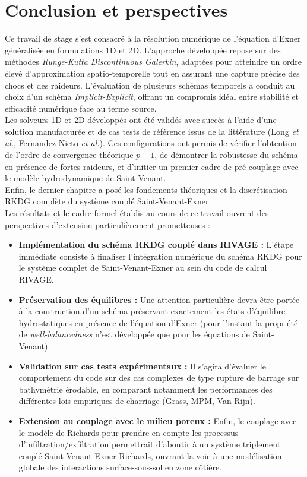 \documentclass[11pt, a4paper, oneside]{report}
\begin{document}
\chapter*{Conclusion et perspectives}

Ce travail de stage s'est consacré à la résolution numérique de l'équation d'Exner généralisée en formulations 1D et 2D. L'approche développée repose sur des méthodes \textit{Runge-Kutta Discontinuous Galerkin}, adaptées pour atteindre un ordre élevé d'approximation spatio-temporelle tout en assurant une capture précise des chocs et des raideurs. L'évaluation de plusieurs schémas temporels a conduit au choix d'un schéma \textit{Implicit-Explicit}, offrant un compromis idéal entre stabilité et efficacité numérique face au terme source. \\
Les solveurs 1D et 2D développés ont été validés avec succès à l'aide d'une solution manufacturée et de cas tests de référence issus de la littérature (Long \textit{et al.}, Fernandez-Nieto \textit{et al.}). Ces configurations ont permis de vérifier l'obtention de l'ordre de convergence théorique $p+1$, de démontrer la robustesse du schéma en présence de fortes raideurs, et d'initier un premier cadre de pré-couplage avec le modèle hydrodynamique de Saint-Venant. \\
Enfin, le dernier chapitre a posé les fondements théoriques et la discrétisation RKDG complète du système couplé Saint-Venant-Exner. \\

Les résultats et le cadre formel établis au cours de ce travail ouvrent des perspectives d'extension particulièrement prometteuses :
\begin{itemize}
    \item \textbf{Implémentation du schéma RKDG couplé dans RIVAGE :} L'étape immédiate consiste à finaliser l'intégration numérique du schéma RKDG pour le système complet de Saint-Venant-Exner au sein du code de calcul RIVAGE.
    \item \textbf{Préservation des équilibres :} Une attention particulière devra être portée à la construction d'un schéma préservant exactement les états d'équilibre hydrostatiques en présence de l'équation d'Exner (pour l'instant la propriété de \textit{well-balancedness} n'est développée que pour les équations de Saint-Venant).
    \item \textbf{Validation sur cas tests expérimentaux :} Il s'agira d'évaluer le comportement du code sur des cas complexes de type rupture de barrage sur bathymétrie érodable, en comparant notamment les performances des différentes lois empiriques de charriage (Grass, MPM, Van Rijn).
    \item \textbf{Extension au couplage avec le milieu poreux :} Enfin, le couplage avec le modèle de Richards pour prendre en compte les processus d'infiltration/exfiltration permettrait d'aboutir à un système triplement couplé Saint-Venant-Exner-Richards, ouvrant la voie à une modélisation globale des interactions surface-sous-sol en zone côtière.
\end{itemize}
\end{document}
